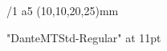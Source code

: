 \fontfam[ebgaramond]
\typosize[11/22]

\margins/1 a5 (10,10,20,25)mm

\footlinedist=40pt

\parindent=0pt\relax

\newtoks\linetocenter

\def\startpoem{%
	\vfil\break
	\bgroup
	\obeylines
	\leftskip0pt \rightskip=\leftskip
	\smash{\centerline{\font\debgaramond "EBGaramond12-Regular" at 12pt\debgaramond \char"2766\relax}}
	\vskip\baselineskip
	\setbox0=\hbox{\the\linetocenter}\relax
	\leftskip=\dimexpr(\hsize-\wd0)/2\relax
}

\def\stoppoem{%
	\egroup
}

\font\dante "DanteMTStd-Regular" at 11pt \dante
